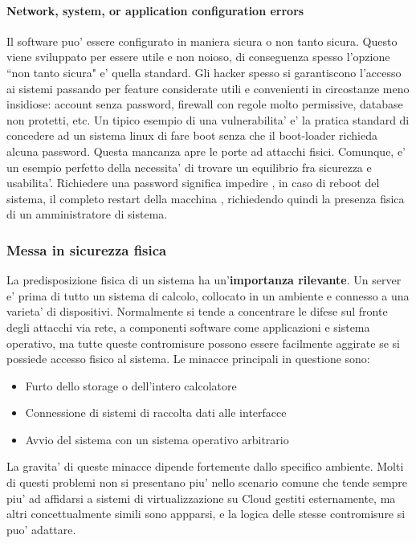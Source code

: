 \paragraph{Network, system, or application configuration errors}
Il software puo' essere configurato in maniera sicura o non tanto sicura. Questo viene sviluppato per essere utile e non noioso, di conseguenza spesso l'opzione ``non tanto sicura" e' quella standard. Gli hacker spesso si garantiscono l'accesso ai sistemi passando per feature considerate utili e convenienti in circostanze meno insidiose: account senza password, firewall con regole molto permissive, database non protetti, etc. Un tipico esempio di una vulnerabilita' e' la pratica standard di concedere ad un sistema linux di fare boot senza che il boot-loader richieda alcuna password. Questa mancanza apre le porte ad attacchi fisici. Comunque, e' un esempio perfetto della necessita' di trovare un equilibrio fra sicurezza e usabilita'. Richiedere una password significa impedire , in caso di reboot del sistema, il completo restart della macchina , richiedendo quindi la presenza fisica di un amministratore di sistema.

\subsubsection{Messa in sicurezza fisica}
La predisposizione fisica di un sistema ha un'\textbf{importanza rilevante}. Un server e' prima di tutto un sistema di calcolo, collocato in un ambiente e connesso a una varieta' di dispositivi. Normalmente si tende a concentrare le difese sul fronte degli attacchi via rete, a componenti software come applicazioni e sistema operativo, ma tutte queste contromisure possono essere facilmente aggirate se si possiede accesso fisico al sistema. Le minacce principali in questione sono:
\begin{itemize}
	\item Furto dello storage o dell'intero calcolatore
	\item Connessione di sistemi di raccolta dati alle interfacce
	\item Avvio del sistema con un sistema operativo arbitrario
\end{itemize}
La gravita' di queste minacce dipende fortemente dallo specifico ambiente. Molti di questi problemi non si presentano piu' nello scenario comune che tende sempre piu' ad affidarsi a sistemi di virtualizzazione su Cloud gestiti esternamente, ma altri concettualmente simili sono appparsi, e la logica delle stesse contromisure si puo' adattare.
		
